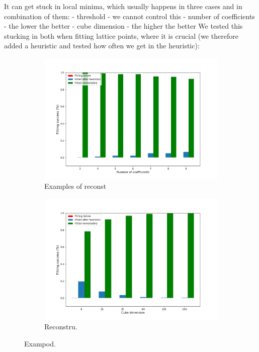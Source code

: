 It can get stuck in local minima, which usually happens in three cases and in combination of them:
- threshold - we cannot control this
- number of coefficients - the lower the better
- cube dimension - the higher the better
We tested this stucking in both when fitting lattice points, where it is crucial (we therefore added a heuristic and tested how often we get in the heuristic):

\begin{figure}[t]
	\centering
	\vspace{1em}
	\begin{subfigure}[t]{0.49\textwidth}
		\includegraphics[width=\linewidth]{img/results_perf_fitting_cd16.png}
		\caption{Examples of reconst}
		\label{fig:mom}
	\end{subfigure} \hspace{0.1em}
	\begin{subfigure}[t]{0.49\textwidth}
		\includegraphics[width=\linewidth]{img/results_perf_fitting_9moments.png}
		\caption{Reconstru.}
		\label{fig:m}
	\end{subfigure}
	\caption{Exampod.}
	\label{fig:temp}
\end{figure}


